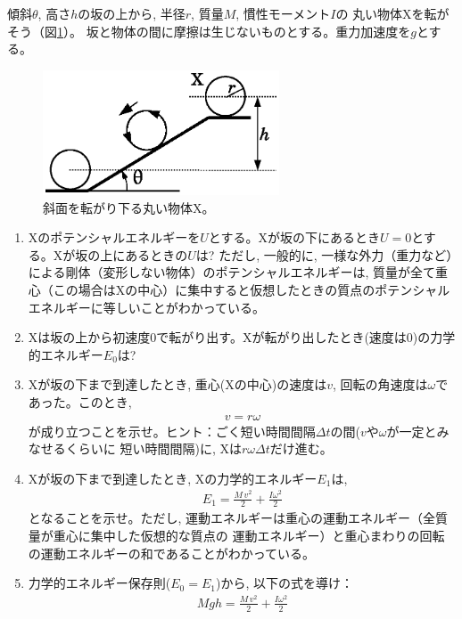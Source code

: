 %
\begin{q}\label{q:mominert_wheel_slope}
傾斜$\theta$, 高さ$h$の坂の上から, 半径$r$, 質量$M$, 慣性モーメント$I$の
丸い物体Xを転がそう（図\ref{fig:slope_wheel}）。
坂と物体の間に摩擦は生じないものとする。重力加速度を$g$とする。
\begin{figure}[h]
    \centering
    \includegraphics[width=7.0cm]{slope_wheel.eps}
    \caption{斜面を転がり下る丸い物体X。}\label{fig:slope_wheel}
\end{figure}\begin{enumerate}
\item Xのポテンシャルエネルギーを$U$とする。Xが坂の下にあるとき$U=0$とする。Xが坂の上にあるときの$U$は?
ただし, 一般的に, 一様な外力（重力など）による剛体（変形しない物体）のポテンシャルエネルギーは, 
質量が全て重心（この場合はXの中心）に集中すると仮想したときの質点のポテンシャルエネルギーに等しいことがわかっている。
\item Xは坂の上から初速度0で転がり出す。Xが転がり出したとき(速度は0)の力学的エネルギー$E_0$は?
\item Xが坂の下まで到達したとき, 重心(Xの中心)の速度は$v$, 回転の角速度は$\omega$であった。このとき, 
\begin{eqnarray}
v=r\omega
\end{eqnarray}
が成り立つことを示せ。ヒント：ごく短い時間間隔$\Delta t$の間($v$や$\omega$が一定とみなせるくらいに
短い時間間隔)に, Xは$r\omega\Delta t$だけ進む。
\vspace{0.1cm}
\item Xが坂の下まで到達したとき, Xの力学的エネルギー$E_1$は, 
\begin{eqnarray}
E_1=\frac{M\,v^2}{2}+\frac{I\omega^2}{2}
\end{eqnarray}
となることを示せ。ただし, 運動エネルギーは重心の運動エネルギー（全質量が重心に集中した仮想的な質点の
運動エネルギー）と重心まわりの回転の運動エネルギーの和であることがわかっている。
\item 力学的エネルギー保存則($E_0=E_1$)から, 以下の式を導け：
\begin{eqnarray}
Mgh=\frac{M\,v^2}{2}+\frac{I\omega^2}{2}
\end{eqnarray}

\end{enumerate}
\end{q}
